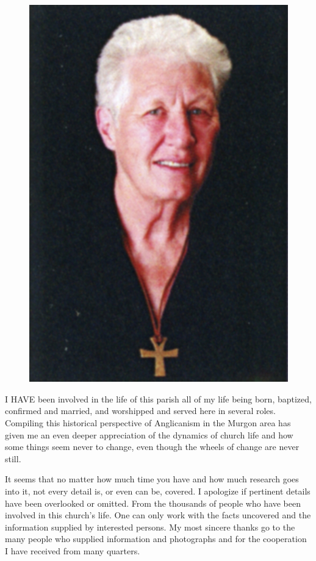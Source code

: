 \begin{figure}
\begin{center}
\includegraphics[width=1.\linewidth,center]{../images/theAuthor.jpg}
\caption{ }
\end{center}
\end{figure}




\lettrine[lines=3]{I}{ HAVE}
 been involved in the life of this parish all of my life being born, baptized, confirmed and married, and worshipped and served here in several roles. Compiling this historical perspective of Anglicanism in the Murgon area has given me an even deeper appreciation of the dynamics of church life and how some things seem never to change, even though the wheels of change are never still.

It seems that no matter how much time you have and how much research goes into it, not every detail is, or even can be, covered. I apologize if pertinent details have been overlooked or omitted. From the thousands of people who have been involved in this church's life. One can only work with the facts uncovered and the information supplied by interested persons. My most sincere thanks go to the many people who supplied information and photographs and for the cooperation I have received from many quarters.



